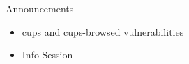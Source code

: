 \begin{frame}{Announcements}
    \begin{itemize}
        \item cups and cups-browsed vulnerabilities
        \item Info Session
    \end{itemize}
\end{frame}
